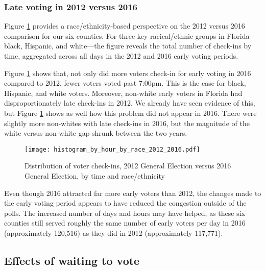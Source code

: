 \documentclass[12pt,titlepage]{article}
\begin{document}
% 

\subsubsection*{Late voting in 2012 versus 2016}

Figure \ref{fig:race2012and2016} provides a race/ethnicity-based
perspective on the 2012 versus 2016 comparison for our six counties.
For three key racical/ethnic groups in Florida---black, Hispanic, and
white---the figure reveals the total number of check-ins by time,
aggregated across all days in the 2012 and 2016 early voting periods.

Figure \ref{fig:race2012and2016} shows that, not only did more voters
check-in for early voting in 2016 compared to 2012, fewer voters voted
past 7:00pm.  This is the case for black, Hispanic, and white
voters. Moreover, non-white early voters in Florida had
disproportionately late check-ins in 2012.  We already have seen
evidence of this, but Figure \ref{fig:race2012and2016} shows as well
how this problem did not appear in 2016.  There were slightly more
non-whites with late check-ins in 2016, but the magnitude of the white
versus non-white gap shrunk between the two years.

\begin{figure}[!ht]
  \caption{Distribution of voter check-ins, 2012 General Election
    versus 2016 General Election, by time and race/ethnicity}
  \label{fig:race2012and2016}
  \centering
  \centering\texttt{[image: histogram\_by\_hour\_by\_race\_2012\_2016.pdf]}
\end{figure}

Even though 2016 attracted far more early voters than 2012, the
changes made to the early voting period appears to have reduced the
congestion outside of the polls. The increased number of days and
hours may have helped, as these six counties still served roughly the
same number of early voters per day in 2016 (approximately 120,516) as
they did in 2012 (approximately 117,771). 



\subsection*{Effects of waiting to vote}
\end{document}
